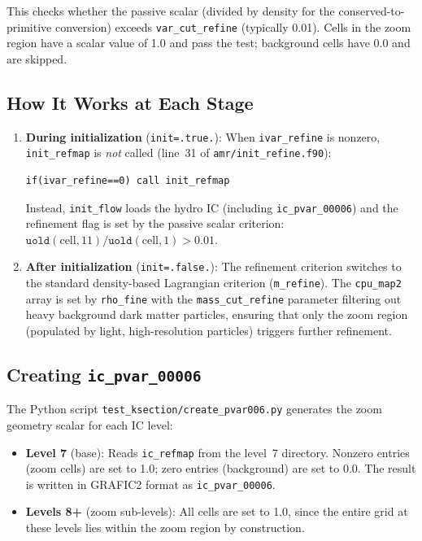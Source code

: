 \documentclass[11pt,fleqn]{book}
\begin{document}
This checks whether the passive scalar (divided by density for the conserved-to-primitive conversion) exceeds \texttt{var\_cut\_refine} (typically 0.01). Cells in the zoom region have a scalar value of 1.0 and pass the test; background cells have 0.0 and are skipped.

\subsection{How It Works at Each Stage}

\begin{enumerate}
  \item \textbf{During initialization} (\texttt{init=.true.}): When \texttt{ivar\_refine} is nonzero, \texttt{init\_refmap} is \emph{not} called (line~31 of \texttt{amr/init\_refine.f90}):
\begin{lstlisting}[style=fortran,numbers=none]
if(ivar_refine==0) call init_refmap
\end{lstlisting}
  Instead, \texttt{init\_flow} loads the hydro IC (including \texttt{ic\_pvar\_00006}) and the refinement flag is set by the passive scalar criterion: $\texttt{uold}(\text{cell},11)/\texttt{uold}(\text{cell},1) > 0.01$.

  \item \textbf{After initialization} (\texttt{init=.false.}): The refinement criterion switches to the standard density-based Lagrangian criterion (\texttt{m\_refine}). The \texttt{cpu\_map2} array is set by \texttt{rho\_fine} with the \texttt{mass\_cut\_refine} parameter filtering out heavy background dark matter particles, ensuring that only the zoom region (populated by light, high-resolution particles) triggers further refinement.
\end{enumerate}

\subsection{Creating \texttt{ic\_pvar\_00006}}

The Python script \texttt{test\_ksection/create\_pvar006.py} generates the zoom geometry scalar for each IC level:

\begin{itemize}[leftmargin=2em]
  \item \textbf{Level 7} (base): Reads \texttt{ic\_refmap} from the level~7 directory. Nonzero entries (zoom cells) are set to 1.0; zero entries (background) are set to 0.0. The result is written in GRAFIC2 format as \texttt{ic\_pvar\_00006}.
  \item \textbf{Levels 8+} (zoom sub-levels): All cells are set to 1.0, since the entire grid at these levels lies within the zoom region by construction.
\end{itemize}
\end{document}

